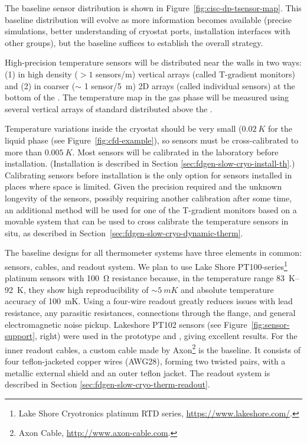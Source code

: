  
The baseline sensor distribution 
is shown in Figure~\ref{fig:cisc-dp-tsensor-map}. This baseline distribution will evolve as more information becomes available (precise  simulations, better understanding of cryostat ports, installation interfaces with other groups), but the baseline suffices to establish the overall strategy.


High-precision temperature sensors will be distributed near the   walls in two ways:
(1) in high density (\(>1\) sensors/\si{m}) vertical arrays %
(called T-gradient monitors) and (2) in coarser ($\sim$ 1 sensor/\SI{5}{m}) 2D arrays %
(called individual sensors) at the bottom of the .
The temperature map in the gas phase will be measured using several vertical arrays of standard  distributed above the .  



Temperature variations inside the cryostat should be very small ($\SI{0.02}{K}$ for the liquid phase (see Figure~\ref{fig:cfd-example}),
so sensors must be cross-calibrated to more than $\SI{0.005}{K}$. Most sensors will be calibrated in the laboratory before installation.
(Installation is described in Section \ref{sec:fdgen-slow-cryo-install-th}.)
Calibrating sensors before installation is the only option for sensors installed in places where space is limited. 
Given the precision required and the unknown longevity of the sensors, possibly requiring another  calibration after some time, an additional method
will be used for one of the T-gradient monitors based on a movable system that can be used to cross calibrate
the temperature sensors in situ, as described in Section~\ref{sec:fdgen-slow-cryo-dynamic-therm}.

The baseline designs for all thermometer systems have three elements in
common: sensors, cables, and readout system. We plan to use Lake Shore
PT100-series\footnote{Lake Shore Cryotronics\texttrademark{} platinum RTD series,
  \url{https://www.lakeshore.com/}.} %
platinum sensors with \SI{100}{\ohm} resistance %
because, in
the temperature range \SIrange{83}{92}{K}, %
they 
show high reproducibility of $\sim\SI{5}{mK}$ and absolute temperature
accuracy of \SI{100}{mK}.  Using a four-wire readout greatly reduces
issues with lead resistance, any parasitic resistances,
connections through the flange, and general electromagnetic noise
pickup. Lakeshore PT102 sensors (see
Figure~\ref{fig:sensor-support}, right) were used in the  prototype
and , %
giving excellent results. For the inner
readout cables, a custom cable made by Axon\footnote{Axon\texttrademark{} Cable, \url{http://www.axon-cable.com}.}
is the baseline. It
consists of four teflon-jacketed copper wires (AWG28), forming two
twisted pairs, with a metallic external shield and an outer teflon
jacket.
The readout system is described in Section \ref{sec:fdgen-slow-cryo-therm-readout}.

